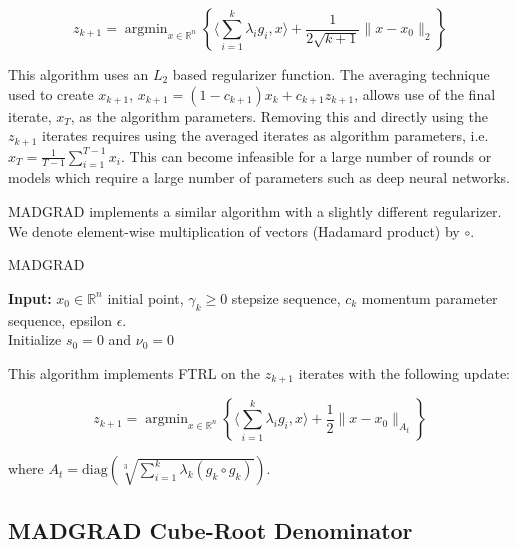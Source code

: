 \documentclass{article}
\newcommand{\R}{\mathbb{R}}
\newcommand{\argmin}{\mathop{\text{argmin}}}
\newcommand{\diag}{\text{diag}}
\begin{document}
\[
  z_{k+1} = \argmin_{x \in \R^n}\left\{\langle \sum\limits_{i=1}^{k}\lambda_i g_i, x \rangle + \frac{1}{2\sqrt{k+1}}\|x
  - x_0\|_2\right\}
\]

This algorithm uses an $L_2$ based regularizer function. The averaging technique used to create $x_{k+1}$, $x_{k+1} = (1
- c_{k+1})x_k + c_{k+1}z_{k+1}$, allows use of the final iterate, $x_T$, as the algorithm parameters. Removing this and
directly using the $z_{k+1}$ iterates requires using the averaged iterates as algorithm parameters, i.e. $x_T =
\frac{1}{T-1}\sum_{i=1}^{T-1} x_i$. This can become infeasible for a large number of rounds or models which require a
large number of parameters such as deep neural networks.

MADGRAD implements a similar algorithm with a slightly different regularizer. We denote element-wise multiplication of
vectors (Hadamard product) by $\circ$.

\begin{algorithm}
  \caption{MADGRAD}\label{algo:madgrad}
  \textbf{Input:} $x_0 \in \R^n$ initial point, $\gamma_k \geq 0$ stepsize sequence, $c_k$ momentum parameter
  sequence, epsilon $\epsilon$. \\
  Initialize $s_0= 0$ and $\nu_0 = 0$ \\
\end{algorithm}

This algorithm implements FTRL on the $z_{k+1}$ iterates with the following update:

\[
  z_{k+1} = \argmin_{x \in \R^n}\left\{\langle \sum\limits_{i=1}^{k}\lambda_i g_i, x \rangle + \frac{1}{2}\|x
  - x_0\|_{A_t}\right\}
\]

where $A_t = \diag\left(\sqrt[3]{\sum_{i=1}^{k} \lambda_k (g_{k} \circ g_k)}\right)$.

\subsection{MADGRAD Cube-Root Denominator}
\end{document}

